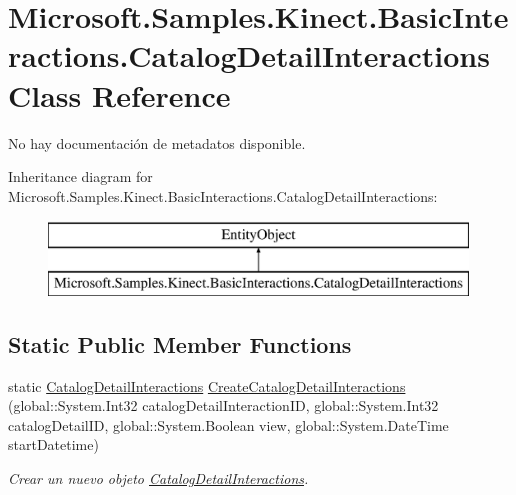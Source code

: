\hypertarget{class_microsoft_1_1_samples_1_1_kinect_1_1_basic_interactions_1_1_catalog_detail_interactions}{\section{Microsoft.\-Samples.\-Kinect.\-Basic\-Interactions.\-Catalog\-Detail\-Interactions Class Reference}
\label{class_microsoft_1_1_samples_1_1_kinect_1_1_basic_interactions_1_1_catalog_detail_interactions}
}


No hay documentación de metadatos disponible.  


Inheritance diagram for Microsoft.\-Samples.\-Kinect.\-Basic\-Interactions.\-Catalog\-Detail\-Interactions\-:\begin{figure}[H]
\begin{center}
\leavevmode
\includegraphics[height=2.000000cm]{class_microsoft_1_1_samples_1_1_kinect_1_1_basic_interactions_1_1_catalog_detail_interactions}
\end{center}
\end{figure}
\subsection*{Static Public Member Functions}
\begin{DoxyCompactItemize}
\item 
static \hyperlink{class_microsoft_1_1_samples_1_1_kinect_1_1_basic_interactions_1_1_catalog_detail_interactions}{Catalog\-Detail\-Interactions} \hyperlink{class_microsoft_1_1_samples_1_1_kinect_1_1_basic_interactions_1_1_catalog_detail_interactions_ab6175e38ab8a1c00fa1699650af5c695}{Create\-Catalog\-Detail\-Interactions} (global\-::\-System.\-Int32 catalog\-Detail\-Interaction\-I\-D, global\-::\-System.\-Int32 catalog\-Detail\-I\-D, global\-::\-System.\-Boolean view, global\-::\-System.\-Date\-Time start\-Datetime)
\begin{DoxyCompactList}\small\item\em Crear un nuevo objeto \hyperlink{class_microsoft_1_1_samples_1_1_kinect_1_1_basic_interactions_1_1_catalog_detail_interactions}{Catalog\-Detail\-Interactions}. \end{DoxyCompactList}\end{DoxyCompactItemize}
